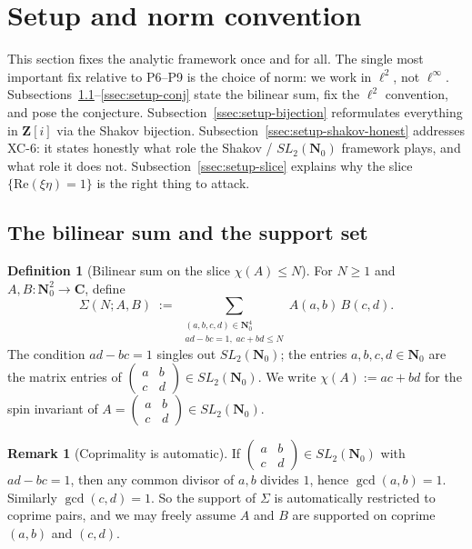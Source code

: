 \documentclass[11pt]{article}
\theoremstyle{definition}
\newtheorem{definition}[theorem]{Definition}
\newtheorem{remark}[theorem]{Remark}
\newcommand{\Nz}{\mathbf{N}_0}
\newcommand{\Z}{\mathbf{Z}}
\newcommand{\C}{\mathbf{C}}
\newcommand{\Zi}{\Z[i]}
\newcommand{\SLNz}{SL_2(\Nz)}
\renewcommand{\Re}{\mathrm{Re}}
\begin{document}
\section{Setup and norm convention}\label{sec:setup}

This section fixes the analytic framework once and for all. The single most important fix relative to P6--P9 is the choice of norm: we work in $\ell^2$, not $\ell^\infty$. Subsections~\ref{ssec:setup-bilin}--\ref{ssec:setup-conj} state the bilinear sum, fix the $\ell^2$ convention, and pose the conjecture. Subsection~\ref{ssec:setup-bijection} reformulates everything in $\Zi$ via the Shakov bijection. Subsection~\ref{ssec:setup-shakov-honest} addresses XC-6: it states honestly what role the Shakov / $\SLNz$ framework plays, and what role it does not. Subsection~\ref{ssec:setup-slice} explains why the slice $\{\Re(\xi\eta)=1\}$ is the right thing to attack.

\subsection{The bilinear sum and the support set}\label{ssec:setup-bilin}

\begin{definition}[Bilinear sum on the slice $\chi(A)\le N$]\label{def:bilin-sum}
For $N\ge 1$ and $A,B:\Nz^2\to\C$, define
\[
\Sigma(N;A,B)\;:=\;\sum_{\substack{(a,b,c,d)\in\Nz^4\\ ad-bc=1,\;ac+bd\le N}}A(a,b)\,B(c,d).
\]
The condition $ad-bc=1$ singles out $\SLNz$; the entries $a,b,c,d\in\Nz$ are the matrix entries of $\begin{pmatrix}a&b\\c&d\end{pmatrix}\in\SLNz$. We write $\chi(A):=ac+bd$ for the spin invariant of $A=\begin{pmatrix}a&b\\c&d\end{pmatrix}\in\SLNz$.
\end{definition}

\begin{remark}[Coprimality is automatic]\label{rmk:coprime-automatic}
If $\begin{pmatrix}a&b\\c&d\end{pmatrix}\in\SLNz$ with $ad-bc=1$, then any common divisor of $a,b$ divides $1$, hence $\gcd(a,b)=1$. Similarly $\gcd(c,d)=1$. So the support of $\Sigma$ is automatically restricted to coprime pairs, and we may freely assume $A$ and $B$ are supported on coprime $(a,b)$ and $(c,d)$.
\end{remark}
\end{document}
